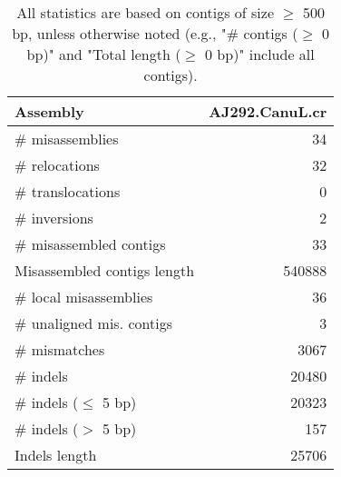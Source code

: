 \documentclass[12pt,a4paper]{article}
\begin{document}
\begin{table}[ht]
\begin{center}
\caption{All statistics are based on contigs of size $\geq$ 500 bp, unless otherwise noted (e.g., "\# contigs ($\geq$ 0 bp)" and "Total length ($\geq$ 0 bp)" include all contigs).}
\begin{tabular}{|l*{1}{|r}|}
\hline
Assembly & AJ292.CanuL.cr \\ \hline
\# misassemblies & 34 \\ \hline
\hspace{5mm}\# relocations & 32 \\ \hline
\hspace{5mm}\# translocations & 0 \\ \hline
\hspace{5mm}\# inversions & 2 \\ \hline
\# misassembled contigs & 33 \\ \hline
Misassembled contigs length & 540888 \\ \hline
\# local misassemblies & 36 \\ \hline
\# unaligned mis. contigs & 3 \\ \hline
\# mismatches & 3067 \\ \hline
\# indels & 20480 \\ \hline
\hspace{5mm}\# indels ($\leq$ 5 bp) & 20323 \\ \hline
\hspace{5mm}\# indels ($>$ 5 bp) & 157 \\ \hline
Indels length & 25706 \\ \hline
\end{tabular}
\end{center}
\end{table}
\end{document}
